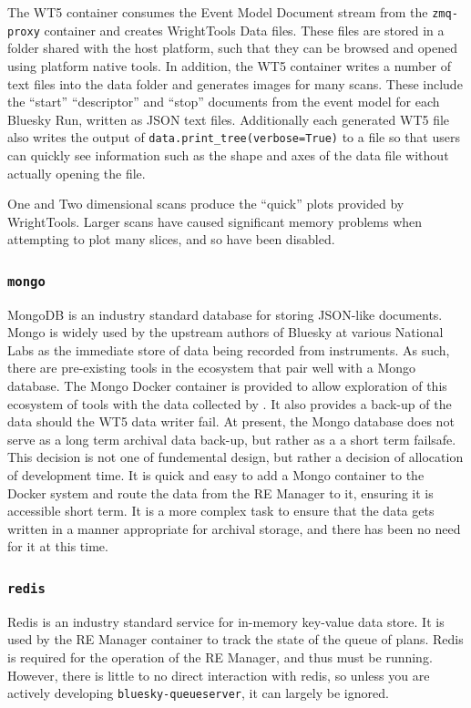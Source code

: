 The WT5 container consumes the Event Model Document stream from the \texttt{zmq-proxy} container and creates WrightTools Data files.
These files are stored in a folder shared with the host platform, such that they can be browsed and opened using platform native tools.
In addition, the WT5 container writes a number of text files into the data folder and generates images for many scans.
These include the ``start'' ``descriptor'' and ``stop'' documents from the event model for each Bluesky Run, written as JSON text files.
Additionally each generated WT5 file also writes the output of \texttt{data.print\_tree(verbose=True)} to a file so that users can quickly see information such as the shape and axes of the data file without actually opening the file.

One and Two dimensional scans produce the ``quick'' plots provided by WrightTools.
Larger scans have caused significant memory problems when attempting to plot many slices, and so have been disabled.

\subsubsection{\texttt{mongo}}

MongoDB\cite{} is an industry standard database for storing JSON-like documents.
Mongo is widely used by the upstream authors of Bluesky at various National Labs as the immediate store of data being recorded from instruments.
As such, there are pre-existing tools in the ecosystem that pair well with a Mongo database.
The Mongo Docker container is provided to allow exploration of this ecosystem of tools with the data collected by \biab.
It also provides a back-up of the data should the WT5 data writer fail.
At present, the Mongo database does not serve as a long term archival data back-up, but rather as a a short term failsafe.
This decision is not one of fundemental design, but rather a decision of allocation of development time.
It is quick and easy to add a Mongo container to the Docker system and route the data from the RE Manager to it, ensuring it is accessible short term.
It is a more complex task to ensure that the data gets written in a manner appropriate for archival storage, and there has been no need for it at this time.

\subsubsection{\texttt{redis}}

Redis\cite{} is an industry standard service for in-memory key-value data store.
It is used by the RE Manager container to track the state of the queue of plans.
Redis is required for the operation of the RE Manager, and thus must be running.
However, there is little to no direct interaction with redis, so unless you are actively developing \texttt{bluesky-queueserver}, it can largely be ignored.

